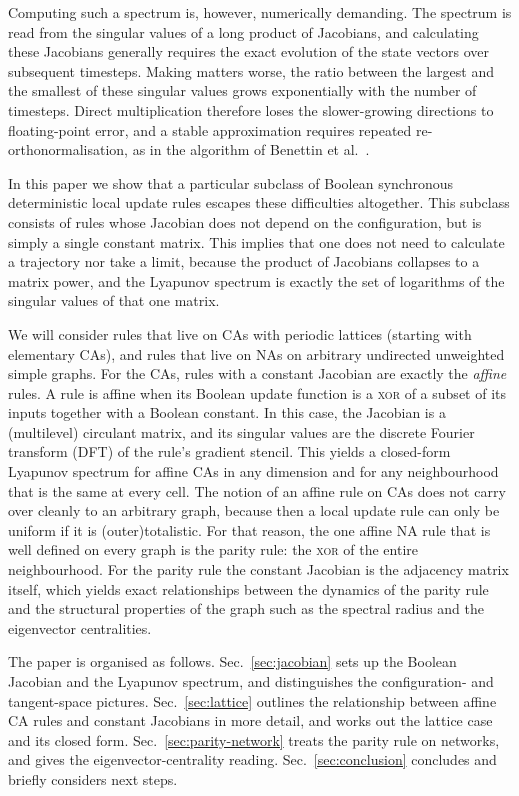 \documentclass[a4paper,fleqn]{cas-dc}
\begin{document}
Computing such a spectrum is, however, numerically demanding. The spectrum is read from the singular values of a long product of Jacobians, and calculating these Jacobians generally requires the exact evolution of the state vectors over subsequent timesteps. Making matters worse, the ratio between the largest and the smallest of these singular values grows exponentially with the number of timesteps. Direct multiplication therefore loses the slower-growing directions to floating-point error, and a stable approximation requires repeated re-orthonormalisation, as in the algorithm of Benettin et al.~\cite{benettin1980lyapunov1,benettin1980lyapunov2}.

In this paper we show that a particular subclass of Boolean synchronous deterministic local update rules escapes these difficulties altogether. This subclass consists of rules whose Jacobian does not depend on the configuration, but is simply a single constant matrix. This implies that one does not need to calculate a trajectory nor take a limit, because the product of Jacobians collapses to a matrix power, and the Lyapunov spectrum is exactly the set of logarithms of the singular values of that one matrix.

We will consider rules that live on CAs with periodic lattices (starting with elementary CAs), and rules that live on NAs on arbitrary undirected unweighted simple graphs. For the CAs, rules with a constant Jacobian are exactly the \emph{affine} rules. A rule is affine when its Boolean update function is a \textsc{xor} of a subset of its inputs together with a Boolean constant. In this case, the Jacobian is a (multilevel) circulant matrix, and its singular values are the discrete Fourier transform (DFT) of the rule's gradient stencil. This yields a closed-form Lyapunov spectrum for affine CAs in any dimension and for any neighbourhood that is the same at every cell. The notion of an affine rule on CAs does not carry over cleanly to an arbitrary graph, because then a local update rule can only be uniform if it is (outer)totalistic. For that reason, the one affine NA rule that is well defined on every graph is the parity rule: the \textsc{xor} of the entire neighbourhood. For the parity rule the constant Jacobian is the adjacency matrix itself, which yields exact relationships between the dynamics of the parity rule and the structural properties of the graph such as the spectral radius and the eigenvector centralities.

The paper is organised as follows. Sec.~\ref{sec:jacobian} sets up the Boolean Jacobian and the Lyapunov spectrum, and distinguishes the configuration- and tangent-space pictures. Sec.~\ref{sec:lattice} outlines the relationship between affine CA rules and constant Jacobians in more detail, and works out the lattice case and its closed form. Sec.~\ref{sec:parity-network} treats the parity rule on networks, and gives the eigenvector-centrality reading. Sec.~\ref{sec:conclusion} concludes and briefly considers next steps.
\end{document}
